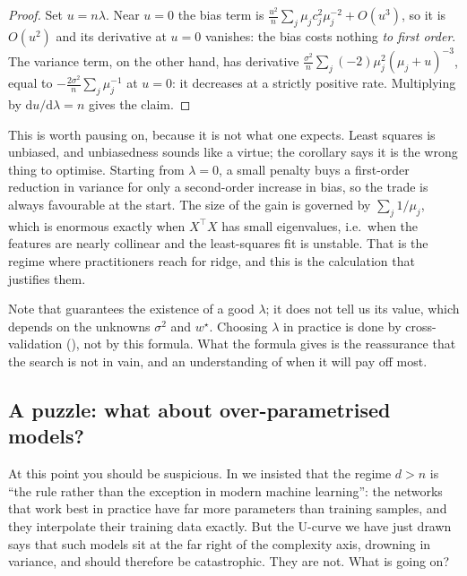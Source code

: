 \begin{proof}
Set $u = n\lambda$. Near $u = 0$ the bias term is $\tfrac{u^2}{n}\sum_j \mu_j c_j^2
\mu_j^{-2} + O(u^3)$, so it is $O(u^2)$ and its derivative at $u = 0$ vanishes: the
bias costs nothing \emph{to first order}. The variance term, on the other hand, has
derivative $\tfrac{\sigma^2}{n} \sum_j (-2)\mu_j^2 (\mu_j + u)^{-3}$, equal to
$-\tfrac{2\sigma^2}{n}\sum_j \mu_j^{-1}$ at $u = 0$: it decreases at a strictly
positive rate. Multiplying by $\mathrm{d}u/\mathrm{d}\lambda = n$ gives the claim.
\end{proof}

This is worth pausing on, because it is not what one expects. Least squares is
unbiased, and unbiasedness sounds like a virtue; the corollary says it is the wrong
thing to optimise. Starting from $\lambda = 0$, a small penalty buys a first-order
reduction in variance for only a second-order increase in bias, so the trade is always
favourable at the start. The size of the gain is governed by $\sum_j 1/\mu_j$, which is
enormous exactly when $X^\top X$ has small eigenvalues, i.e.\ when the features are
nearly collinear and the least-squares fit is unstable. That is the regime where
practitioners reach for ridge, and this is the calculation that justifies them.

\begin{remark}
Note that  guarantees the existence of a good $\lambda$; it
does not tell us its value, which depends on the unknowns $\sigma^2$ and $w^\star$.
Choosing $\lambda$ in practice is done by cross-validation (), not by
this formula. What the formula gives is the reassurance that the search is not in vain,
and an understanding of when it will pay off most.
\end{remark}


\subsection{A puzzle: what about over-parametrised models?}
\label{subsec:double-descent}

At this point you should be suspicious. In  we insisted that
the regime $d > n$ is ``the rule rather than the exception in modern machine
learning'': the networks that work best in practice have far more parameters than
training samples, and they interpolate their training data exactly. But the U-curve
we have just drawn says that such models sit at the far right of the complexity axis,
drowning in variance, and should therefore be catastrophic. They are not. What is
going on?

